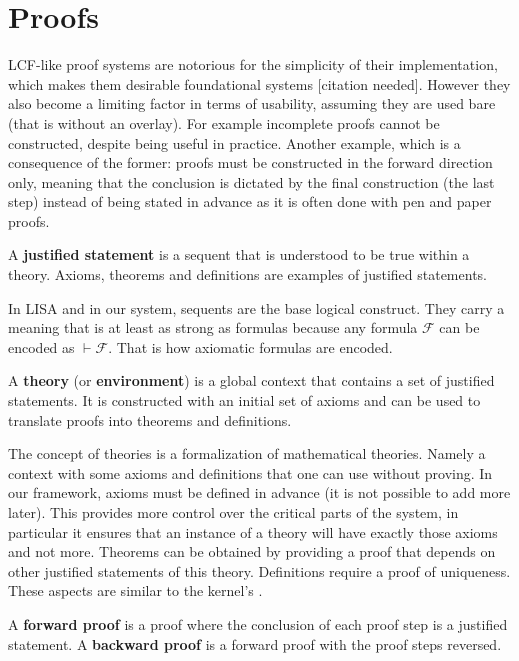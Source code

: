 \section{Proofs}
\label{sec:proofs}

LCF-like proof systems are notorious for the simplicity of their implementation, which makes them desirable foundational systems [citation needed]. However they also become a limiting factor in terms of usability, assuming they are used bare (that is without an overlay). For example incomplete proofs cannot be constructed, despite being useful in practice. Another example, which is a consequence of the former: proofs must be constructed in the forward direction only, meaning that the conclusion is dictated by the final construction (the last step) instead of being stated in advance as it is often done with pen and paper proofs.

\begin{definition}
A \textbf{justified statement} is a sequent that is understood to be true within a theory. Axioms, theorems and definitions are examples of justified statements.
\end{definition}

In LISA and in our system, sequents are the base logical construct. They carry a meaning that is at least as strong as formulas because any formula $\mathcal{F}$ can be encoded as $\vdash \mathcal{F}$. That is how axiomatic formulas are encoded.

\begin{definition}[Theory]
A \textbf{theory} (or \textbf{environment}) is a global context that contains a set of justified statements. It is constructed with an initial set of axioms and can be used to translate proofs into theorems and definitions.
\end{definition}

The concept of theories is a formalization of mathematical theories. Namely a context with some axioms and definitions that one can use without proving. In our framework, axioms must be defined in advance (it is not possible to add more later). This provides more control over the critical parts of the system, in particular it ensures that an instance of a theory will have exactly those axioms and not more. Theorems can be obtained by providing a proof that depends on other justified statements of this theory. Definitions require a proof of uniqueness. These aspects are similar to the kernel's .

\begin{definition}
A \textbf{forward proof} is a proof where the conclusion of each proof step is a justified statement.
A \textbf{backward proof} is a forward proof with the proof steps reversed.
\end{definition}


